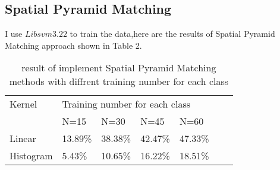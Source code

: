 \documentclass[10pt,twocolumn,letterpaper]{article}
\begin{document}
 \subsection{Spatial Pyramid Matching}
  I use $Libsvm 3.22$ to train the data,here are the results of Spatial Pyramid Matching approach shown in  Table 2.\\
  
  \begin{table}[H]  \centering \caption{result of  implement Spatial Pyramid Matching methods with  diffrent training number for each class}
  	
  	\label{table_time}
  	
  	\begin{tabular}{lllllll}  
  		\centering 
  		\toprule   
  		\multirow{2}{*} {Kernel} & \multicolumn{5}{l}{Training number for each class}   \\
  		\cline{2-5}
  		&N=15 &N=30 & N=45 & N=60 \\  
  		
  		\midrule   
  		
  		Linear &  13.89\% &38.38\% &42.47\% &47.33\%   \\   
  		
  		Histogram &   5.43\% &10.65\% &16.22\% &18.51\%   \\   
  		
  		
  		
  		\bottomrule  
  		
  	\end{tabular}
  	
  \end{table}
 

{\small


}
\end{document}
